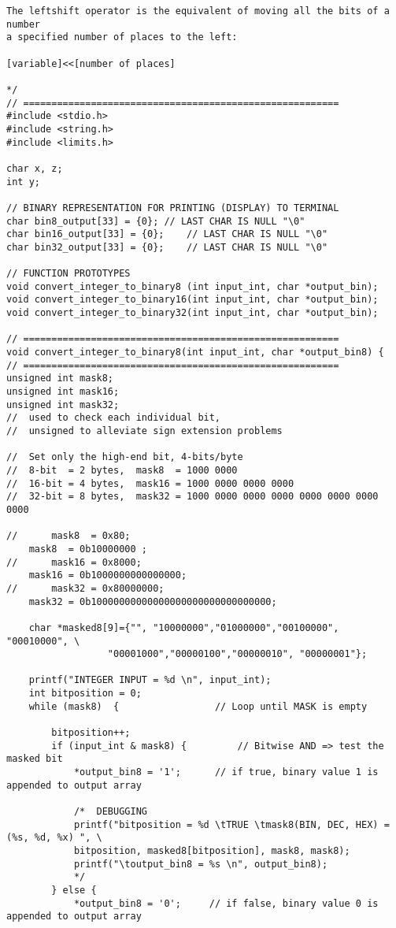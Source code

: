 \begin{lstlisting}[caption={App4-Converting-software-codes-to-binary-bits-pulses}, label=App4-Converting-software-codes-to-binary-bits-pulses]
The leftshift operator is the equivalent of moving all the bits of a number
a specified number of places to the left:

[variable]<<[number of places]

*/
// ========================================================
#include <stdio.h>
#include <string.h>
#include <limits.h>

char x, z;
int y;

// BINARY REPRESENTATION FOR PRINTING (DISPLAY) TO TERMINAL
char bin8_output[33] = {0};	// LAST CHAR IS NULL "\0"
char bin16_output[33] = {0};	// LAST CHAR IS NULL "\0"
char bin32_output[33] = {0};	// LAST CHAR IS NULL "\0"

// FUNCTION PROTOTYPES
void convert_integer_to_binary8 (int input_int, char *output_bin);
void convert_integer_to_binary16(int input_int, char *output_bin);
void convert_integer_to_binary32(int input_int, char *output_bin);

// ========================================================
void convert_integer_to_binary8(int input_int, char *output_bin8) {
// ========================================================
unsigned int mask8;
unsigned int mask16;
unsigned int mask32;      
// 	used to check each individual bit, 
// 	unsigned to alleviate sign extension problems

// 	Set only the high-end bit, 4-bits/byte
// 	8-bit  = 2 bytes,  mask8  = 1000 0000
// 	16-bit = 4 bytes,  mask16 = 1000 0000 0000 0000
// 	32-bit = 8 bytes,  mask32 = 1000 0000 0000 0000 0000 0000 0000 0000

//    	mask8  = 0x80; 	  
	mask8  = 0b10000000 ; 
//  	mask16 = 0x8000; 
	mask16 = 0b1000000000000000;	    
//  	mask32 = 0x80000000;    
	mask32 = 0b10000000000000000000000000000000;

	char *masked8[9]={"", "10000000","01000000","00100000", "00010000", \
			      "00001000","00000100","00000010", "00000001"};

	printf("INTEGER INPUT = %d \n", input_int);
	int bitposition = 0;    
	while (mask8)  {         		 // Loop until MASK is empty

		bitposition++;
		if (input_int & mask8) {     	 // Bitwise AND => test the masked bit
			*output_bin8 = '1';      // if true, binary value 1 is appended to output array

			/*  DEBUGGING              
			printf("bitposition = %d \tTRUE \tmask8(BIN, DEC, HEX) = (%s, %d, %x) ", \
			bitposition, masked8[bitposition], mask8, mask8);
			printf("\toutput_bin8 = %s \n", output_bin8);
			*/
		} else {
			*output_bin8 = '0';     // if false, binary value 0 is appended to output array
	

\end{lstlisting}
